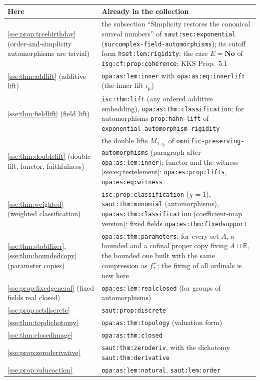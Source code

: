 \documentclass[11pt,a4paper]{article}
\numberwithin{equation}{section}
\theoremstyle{plain}
\theoremstyle{definition}
\theoremstyle{remark}
\newcommand{\No}{\mathbf{No}}
\newcommand{\R}{\mathbb{R}}
\newcommand{\lbl}[1]{\nolinkurl{#1}}%
\newcommand{\fn}[1]{\nolinkurl{#1}}%
\begin{document}
\begin{longtable}{P{52mm}P{97mm}}
\toprule
Here & Already in the collection \\
\midrule
\endhead
\cref{sse:prop:treebirthday} (order-and-simplicity automorphisms are trivial) & the subsection ``Simplicity restores the canonical surreal numbers'' of \lbl{saut:sec:exponential} (\fn{surcomplex-field-automorphisms}); its cutoff form \lbl{hset:lem:rigidity}; the case $E=\No$ of \lbl{isg:cf:prop:coherence}; KKS Prop.~5.1 \\
\cref{sse:thm:addlift} (additive lift) & \lbl{opa:as:lem:inner} with \lbl{opa:as:eq:innerlift} (the inner lift $\iota_\mu$) \\
\cref{sse:thm:fieldlift} (field lift) & \lbl{isc:thm:lift} (any ordered additive embedding), \lbl{opa:as:thm:classification}; for automorphisms \lbl{prop:hahn-lift} of \fn{exponential-automorphism-rigidity} \\
\cref{sse:thm:doublelift} (double lift, functor, faithfulness) & the double lifts $M_{1,\iota_\mu}$ of \fn{omnific-preserving-automorphisms} (paragraph after \lbl{opa:as:lem:inner}); functor and the witness \cref{sse:eq:testelement}: \lbl{opa:es:prop:lifts}, \lbl{opa:es:eq:witness} \\
\cref{sse:thm:weighted} (weighted classification) & \lbl{isc:prop:classification} ($\chi=1$), \lbl{saut:thm:monomial} (automorphisms), \lbl{opa:as:thm:classification} (coefficient-map version); fixed fields \lbl{opa:es:thm:fixedsupport} \\
\cref{sse:thm:stabilizer}, \cref{sse:thm:boundedcopy} (parameter copies) & \lbl{opa:as:thm:parameters}: for every set $A$, a bounded and a cofinal proper copy fixing $A\cup\R$, the bounded one built with the same compression as $f^+_\gamma$; the fixing of all ordinals is new here \\
\cref{sse:prop:fixedgeneral} (fixed fields real closed) & \lbl{opa:es:lem:realclosed} (for groups of automorphisms) \\
\cref{sse:prop:setdiscrete} & \lbl{saut:prop:discrete} \\
\cref{sse:thm:topdichotomy} & \lbl{opa:as:thm:topology} (valuation form) \\
\cref{sse:thm:closedimage} & \lbl{opa:as:thm:closed} \\
\cref{sse:prop:zeroderivative} & \lbl{saut:thm:zeroderiv}, with the dichotomy \lbl{saut:thm:derivative} \\
\cref{sse:prop:valueaction} & \lbl{opa:as:lem:natural}, \lbl{saut:lem:order} \\

\end{longtable}
\end{document}
